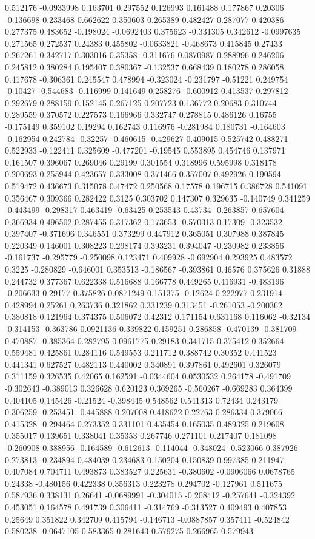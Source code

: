 0.512176 -0.0933998 0.163701 0.297552 0.126993 0.161488 0.177867 0.20306 -0.136698 0.233468 0.662622 0.350603 0.265389 0.482427 0.287077 0.420386 0.277375 0.483652 -0.198024 -0.0692403 0.375623 -0.331305 0.342612 -0.0997635 0.271565 0.272537 0.24383 0.455802 -0.0633821 -0.468673 0.415845 0.27433 0.267261 0.342717 0.303016 0.35358 -0.311676 0.0870987 0.288996 0.246206 0.245812 0.380284 0.195407 0.380367 -0.132537 0.668439 0.180278 0.286058 0.417678 -0.306361 0.245547 0.478994 -0.323024 -0.231797 -0.51221 0.249754 -0.10427 -0.544683 -0.116999 0.141649 0.258276 -0.600912 0.413537 0.297812 0.292679 0.288159 0.152145 0.267125 0.207723 0.136772 0.20683 0.310744 0.289559 0.370572 0.227573 0.166966 0.332747 0.278815 0.486126 0.16755 -0.175149 0.359102 0.19294 0.162743 0.116976 -0.281984 0.180731 -0.164603 -0.162954 0.242784 -0.32257 -0.460615 -0.429627 0.409015 0.525742 0.488271 0.522933 -0.122411 0.325609 -0.477201 -0.19545 0.553895 0.454746 0.137971 0.161507 0.396067 0.269046 0.29199 0.301554 0.318996 0.595998 0.318178 0.200693 0.255944 0.423657 0.333008 0.371466 0.357007 0.492926 0.190594 0.519472 0.436673 0.315078 0.47472 0.250568 0.17578 0.196715 0.386728 0.541091 0.356467 0.309366 0.282422 0.3125 0.303702 0.147307 0.329635 -0.140749 0.341259 -0.443499 -0.298317 0.463419 -0.63425 0.253543 0.43734 -0.263857 0.657604 0.366934 0.496502 0.287455 0.317362 0.173653 -0.570313 0.17309 -0.323532 0.397407 -0.371696 0.346551 0.373299 0.447912 0.365051 0.307988 0.387845 0.220349 0.146001 0.308223 0.298174 0.393231 0.394047 -0.230982 0.233856 -0.161737 -0.295779 -0.250098 0.123471 0.409928 -0.692904 0.293925 0.483572 0.3225 -0.280829 -0.646001 0.353513 -0.186567 -0.393861 0.46576 0.375626 0.31888 0.244732 0.377367 0.622338 0.516688 0.166778 0.449265 0.416931 -0.483196 -0.206633 0.29177 0.375826 0.0871249 0.151375 -0.12624 0.222977 0.231914 0.428994 0.25261 0.263736 0.321862 0.331239 0.313451 -0.261053 -0.200362 0.380818 0.121964 0.374375 0.506072 0.42312 0.171154 0.631168 0.116062 -0.32134 -0.314153 -0.363786 0.0921136 0.339822 0.159251 0.286858 -0.470139 -0.381709 0.470887 -0.385364 0.282795 0.0961775 0.29183 0.341715 0.375412 0.352664 0.559481 0.425861 0.284116 0.549553 0.211712 0.388742 0.30352 0.441523 0.441341 0.627527 0.482113 0.440002 0.340891 0.397861 0.492601 0.326079 0.311159 0.326535 0.42065 0.162591 -0.0344604 0.0530532 0.264178 -0.491709 -0.302643 -0.389013 0.326628 0.620123 0.369265 -0.560267 -0.669283 0.364399 0.404105 0.145426 -0.21524 -0.398445 0.548562 0.541313 0.72434 0.243179 0.306259 -0.253451 -0.445888 0.207008 0.418622 0.22763 0.286334 0.379066 0.415328 -0.294464 0.273352 0.331101 0.435454 0.165035 0.489325 0.219608 0.355017 0.139651 0.338041 0.35353 0.267746 0.271101 0.217407 0.181098 -0.260908 0.388956 -0.164589 -0.612613 -0.114044 -0.348024 -0.523066 0.387926 0.273813 -0.234894 0.484039 0.234683 0.150204 0.150839 0.997385 0.211947 0.407084 0.704711 0.493873 0.383527 0.225631 -0.380602 -0.0906066 0.0678765 0.24338 -0.480156 0.422338 0.356313 0.223278 0.294702 -0.127961 0.511675 0.587936 0.338131 0.26641 -0.0689991 -0.304015 -0.208412 -0.257641 -0.324392 0.453051 0.164578 0.491739 0.306411 -0.314769 -0.313527 0.409493 0.407853 0.25649 0.351822 0.342709 0.415794 -0.146713 -0.0887857 0.357411 -0.524842 0.580238 -0.0647105 0.583365 0.281643 0.579275 0.266965 0.579943 